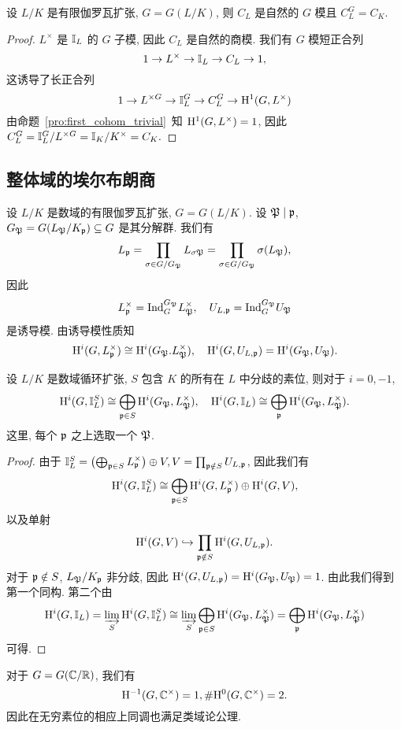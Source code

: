 \begin{proposition}{}{}
设 $L/K$ 是有限伽罗瓦扩张, $G=G(L/K)$, 则 $C_L$ 是自然的 $G$ 模且 $C_L^G=C_K$. 
\end{proposition}
\begin{proof}
$L^\times$ 是 $\BI_L$ 的 $G$ 子模, 因此 $C_L$ 是自然的商模. 我们有 $G$ 模短正合列
  \[1\ra L^\times\ra \BI_L\ra C_L\ra 1,\]
这诱导了长正合列
  \[1\ra L^{\times G}\ra \BI_L^G\ra C_L^G\ra \rmH^1(G,L^\times)\]
由命题~\ref{pro:first_cohom_trivial}~知 $\rmH^1(G,L^\times)=1$, 因此
$C_L^G=\BI_L^G/L^{\times G}=\BI_K/K^\times=C_K.$
\end{proof}


\subsection{整体域的埃尔布朗商}
设 $L/K$ 是数域的有限伽罗瓦扩张, $G=G(L/K)$.
设 $\fP\mid\fp$, $G_\fP=G(L_\fP/K_\fp)\subseteq G$ 是其分解群. 我们有
  \[L_\fp=\prod_{\sigma\in G/G_\fP} L_{\sigma\fP}=\prod_{\sigma\in G/G_\fP} \sigma(L_\fP),\]
因此
  \[L_\fp^\times=\Ind_G^{G_\fP}L_\fP^\times,\quad U_{L,\fp}=\Ind_G^{G_\fP} U_\fP\]
是诱导模. 由诱导模性质知
  \[\rmH^i(G,L_\fp^\times)\cong \rmH^i(G_\fP.L_\fP^\times),\quad\rmH^i(G,U_{L,\fp})=\rmH^i(G_\fP,U_\fP).\]
\begin{proposition}{}{}
设 $L/K$ 是数域循环扩张, $S$ 包含 $K$ 的所有在 $L$ 中分歧的素位, 则对于 $i=0,-1$,
  \[\rmH^i(G,\BI_L^S)\cong\bigoplus_{\fp\in S}\rmH^i(G_\fP,L_\fP^\times),\quad\rmH^i(G,\BI_L)\cong\bigoplus_{\fp}\rmH^i(G_\fP,L_\fP^\times).\]
这里, 每个 $\fp$ 之上选取一个 $\fP$.
\end{proposition}
\begin{proof}
由于 $\BI_L^S=\bigl(\bigoplus_{\fp\in S}L_\fp^\times\bigr)\oplus V, V=\prod_{\fp\notin S}U_{L,\fp}$, 因此我们有
  \[\rmH^i(G,\BI_L^S)\cong\bigoplus_{\fp\in S}\rmH^i(G,L_\fp^\times)\oplus \rmH^i(G,V),\]
以及单射 
  \[\rmH^i(G,V)\inj \prod_{\fp\notin S}\rmH^i(G,U_{L,\fp}).\]
对于 $\fp\notin S$, $L_\fP/K_\fp$ 非分歧, 因此 $\rmH^i(G,U_{L,\fp})=\rmH^i(G_\fP,U_\fP)=1$. 由此我们得到第一个同构.
第二个由
  \[\rmH^i(G,\BI_L)=\ilim_S \rmH^i(G,\BI_L^S)\cong \ilim_S \bigoplus_{\fp\in S}\rmH^i(G_\fP,L_\fP^\times)=\bigoplus_\fp\rmH^i(G_\fP,L_\fP^\times)\]
可得.
\end{proof}

\begin{remark}
对于 $G=G(\BC/\BR)$, 我们有 
  \[\rmH^{-1}(G,\BC^\times)=1,\#\rmH^0(G,\BC^\times)=2.\]
因此在无穷素位的相应上同调也满足类域论公理.
\end{remark}


